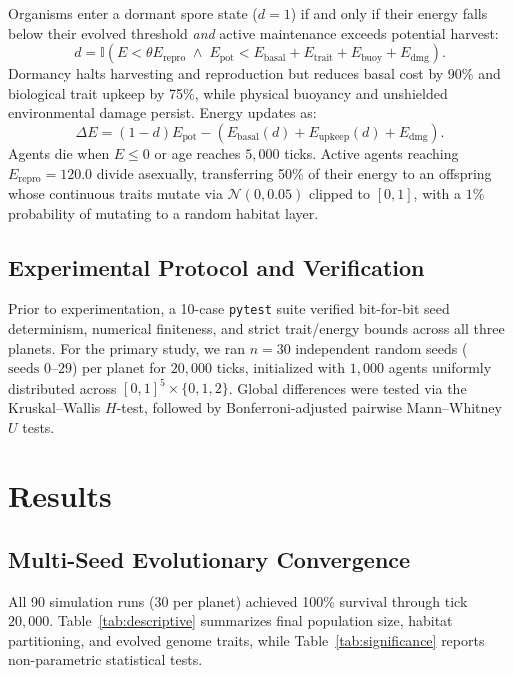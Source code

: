 \documentclass[conference]{IEEEtran}
\begin{document}
Organisms enter a dormant spore state ($d = 1$) if and only if their energy falls below their evolved threshold \textit{and} active maintenance exceeds potential harvest:
\begin{equation}
    d = \mathbb{I}\left(E < \theta E_{\text{repro}} \;\land\; E_{\text{pot}} < E_{\text{basal}} + E_{\text{trait}} + E_{\text{buoy}} + E_{\text{dmg}}\right).
\end{equation}
Dormancy halts harvesting and reproduction but reduces basal cost by 90\% and biological trait upkeep by 75\%, while physical buoyancy and unshielded environmental damage persist. Energy updates as:
\begin{equation}
    \Delta E = (1 - d) E_{\text{pot}} - \left( E_{\text{basal}}(d) + E_{\text{upkeep}}(d) + E_{\text{dmg}} \right).
\end{equation}
Agents die when $E \le 0$ or age reaches $5{,}000$ ticks. Active agents reaching $E_{\text{repro}} = 120.0$ divide asexually, transferring 50\% of their energy to an offspring whose continuous traits mutate via $\mathcal{N}(0, 0.05)$ clipped to $[0, 1]$, with a $1\%$ probability of mutating to a random habitat layer.

\subsection{Experimental Protocol and Verification}
Prior to experimentation, a 10-case \texttt{pytest} suite verified bit-for-bit seed determinism, numerical finiteness, and strict trait/energy bounds across all three planets. For the primary study, we ran $n = 30$ independent random seeds ($\text{seeds } 0\text{--}29$) per planet for $20{,}000$ ticks, initialized with $1{,}000$ agents uniformly distributed across $[0, 1]^5 \times \{0, 1, 2\}$. Global differences were tested via the Kruskal--Wallis $H$-test, followed by Bonferroni-adjusted pairwise Mann--Whitney $U$ tests.

\section{Results}

\subsection{Multi-Seed Evolutionary Convergence}
All 90 simulation runs (30 per planet) achieved 100\% survival through tick $20{,}000$. Table~\ref{tab:descriptive} summarizes final population size, habitat partitioning, and evolved genome traits, while Table~\ref{tab:significance} reports non-parametric statistical tests.
\end{document}

